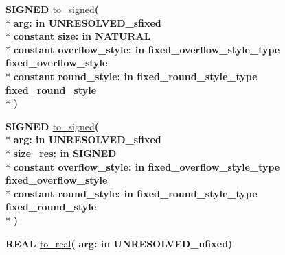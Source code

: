 \begin{DoxyCompactItemize}
{\bfseries {\bfseries \textcolor{comment}{S\+I\+G\+N\+E\+D}\textcolor{vhdlchar}{ }}} \hyperlink{class__fixed__pkg_a470ec6100534d89d907b3d8e672b3e6b}{to\+\_\+signed}{\bfseries  ( }\\*
{\bfseries \textcolor{vhdlchar}{arg\+: }\textcolor{stringliteral}{in }\textcolor{vhdlchar}{U\+N\+R\+E\+S\+O\+L\+V\+E\+D\+\_\+sfixed}}\\*
{\bfseries {\bfseries \textcolor{keywordflow}{constant}\textcolor{vhdlchar}{ }}\textcolor{vhdlchar}{size\+: }\textcolor{stringliteral}{in }{\bfseries \textcolor{comment}{N\+A\+T\+U\+R\+A\+L}\textcolor{vhdlchar}{ }}}\\*
{\bfseries {\bfseries \textcolor{keywordflow}{constant}\textcolor{vhdlchar}{ }}\textcolor{vhdlchar}{overflow\+\_\+style\+: }\textcolor{stringliteral}{in }\textcolor{vhdlchar}{fixed\+\_\+overflow\+\_\+style\+\_\+type     fixed\+\_\+overflow\+\_\+style}}\\*
{\bfseries {\bfseries \textcolor{keywordflow}{constant}\textcolor{vhdlchar}{ }}\textcolor{vhdlchar}{round\+\_\+style\+: }\textcolor{stringliteral}{in }\textcolor{vhdlchar}{fixed\+\_\+round\+\_\+style\+\_\+type     fixed\+\_\+round\+\_\+style}}\\*
{\bfseries  )} 
\item 
{\bfseries {\bfseries \textcolor{comment}{S\+I\+G\+N\+E\+D}\textcolor{vhdlchar}{ }}} \hyperlink{class__fixed__pkg_a10344b797d1b40385ab85edc4709b649}{to\+\_\+signed}{\bfseries  ( }\\*
{\bfseries \textcolor{vhdlchar}{arg\+: }\textcolor{stringliteral}{in }\textcolor{vhdlchar}{U\+N\+R\+E\+S\+O\+L\+V\+E\+D\+\_\+sfixed}}\\*
{\bfseries \textcolor{vhdlchar}{size\+\_\+res\+: }\textcolor{stringliteral}{in }{\bfseries \textcolor{comment}{S\+I\+G\+N\+E\+D}\textcolor{vhdlchar}{ }}}\\*
{\bfseries {\bfseries \textcolor{keywordflow}{constant}\textcolor{vhdlchar}{ }}\textcolor{vhdlchar}{overflow\+\_\+style\+: }\textcolor{stringliteral}{in }\textcolor{vhdlchar}{fixed\+\_\+overflow\+\_\+style\+\_\+type     fixed\+\_\+overflow\+\_\+style}}\\*
{\bfseries {\bfseries \textcolor{keywordflow}{constant}\textcolor{vhdlchar}{ }}\textcolor{vhdlchar}{round\+\_\+style\+: }\textcolor{stringliteral}{in }\textcolor{vhdlchar}{fixed\+\_\+round\+\_\+style\+\_\+type     fixed\+\_\+round\+\_\+style}}\\*
{\bfseries  )} 
\item 
{\bfseries {\bfseries \textcolor{comment}{R\+E\+A\+L}\textcolor{vhdlchar}{ }}} \hyperlink{class__fixed__pkg_a5a07993e8b679308d776fe3fd1b67eb7}{to\+\_\+real}{\bfseries  ( }{\bfseries \textcolor{vhdlchar}{arg\+: }\textcolor{stringliteral}{in }\textcolor{vhdlchar}{U\+N\+R\+E\+S\+O\+L\+V\+E\+D\+\_\+ufixed}}{\bfseries  )} 

\end{DoxyCompactItemize}

